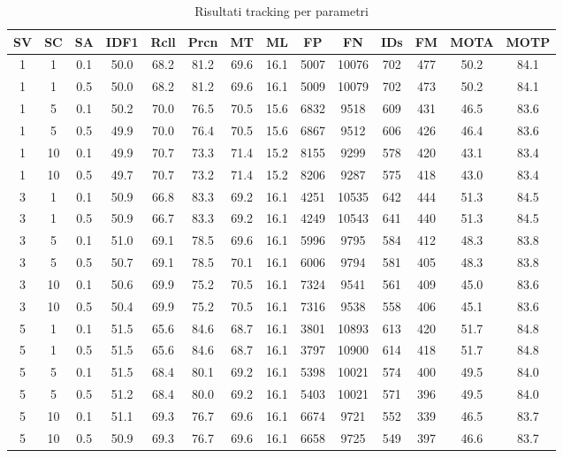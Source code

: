 \begin{table}[h!]
\centering
\begin{tabular}{|c|c|c|c|c|c|c|c|c|c|c|c|c|c|}
\hline
SV & SC & SA & IDF1 & Rcll & Prcn & MT & ML & FP & FN & IDs & FM & MOTA & MOTP\\ [0.5ex] 
\hline
1 & 1 & 0.1 & 50.0 & 68.2 & 81.2 & 69.6 & 16.1 & 5007 & 10076 & 702 & 477 & 50.2 & 84.1\\
1 & 1 & 0.5 & 50.0 & 68.2 & 81.2 & 69.6 & 16.1 & 5009 & 10079 & 702 & 473 & 50.2 & 84.1\\
1 & 5 & 0.1 & 50.2 & 70.0 & 76.5 & 70.5 & 15.6 & 6832 & 9518 & 609 & 431 & 46.5 & 83.6\\
1 & 5 & 0.5 & 49.9 & 70.0 & 76.4 & 70.5 & 15.6 & 6867 & 9512 & 606 & 426 & 46.4 & 83.6\\
1 & 10 & 0.1 & 49.9 & 70.7 & 73.3 & 71.4 & 15.2 & 8155 & 9299 & 578 & 420 & 43.1 & 83.4\\
1 & 10 & 0.5 & 49.7 & 70.7 & 73.2 & 71.4 & 15.2 & 8206 & 9287 & 575 & 418 & 43.0 & 83.4\\
3 & 1 & 0.1 & 50.9 & 66.8 & 83.3 & 69.2 & 16.1 & 4251 & 10535 & 642 & 444 & 51.3 & 84.5\\
3 & 1 & 0.5 & 50.9 & 66.7 & 83.3 & 69.2 & 16.1 & 4249 & 10543 & 641 & 440 & 51.3 & 84.5\\
3 & 5 & 0.1 & 51.0 & 69.1 & 78.5 & 69.6 & 16.1 & 5996 & 9795 & 584 & 412 & 48.3 & 83.8\\
3 & 5 & 0.5 & 50.7 & 69.1 & 78.5 & 70.1 & 16.1 & 6006 & 9794 & 581 & 405 & 48.3 & 83.8\\
3 & 10 & 0.1 & 50.6 & 69.9 & 75.2 & 70.5 & 16.1 & 7324 & 9541 & 561 & 409 & 45.0 & 83.6\\
3 & 10 & 0.5 & 50.4 & 69.9 & 75.2 & 70.5 & 16.1 & 7316 & 9538 & 558 & 406 & 45.1 & 83.6\\
5 & 1 & 0.1 & 51.5 & 65.6 & 84.6 & 68.7 & 16.1 & 3801 & 10893 & 613 & 420 & 51.7 & 84.8\\
5 & 1 & 0.5 & 51.5 & 65.6 & 84.6 & 68.7 & 16.1 & 3797 & 10900 & 614 & 418 & 51.7 & 84.8\\
5 & 5 & 0.1 & 51.5 & 68.4 & 80.1 & 69.2 & 16.1 & 5398 & 10021 & 574 & 400 & 49.5 & 84.0\\
5 & 5 & 0.5 & 51.2 & 68.4 & 80.0 & 69.2 & 16.1 & 5403 & 10021 & 571 & 396 & 49.5 & 84.0\\
5 & 10 & 0.1 & 51.1 & 69.3 & 76.7 & 69.6 & 16.1 & 6674 & 9721 & 552 & 339 & 46.5 & 83.7\\
5 & 10 & 0.5 & 50.9 & 69.3 & 76.7 & 69.6 & 16.1 & 6658 & 9725 & 549 & 397 & 46.6 & 83.7\\
\hline
\end{tabular}
\caption{Risultati tracking per parametri}
\label{risultati tracking per parametri}
\end{table}


